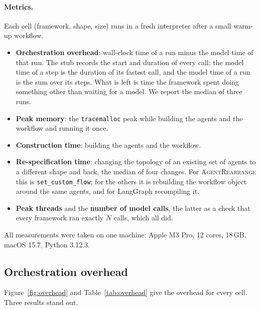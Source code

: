 \documentclass[11pt]{article}
\newcommand{\code}[1]{\texttt{#1}}
\newcommand{\AR}{\textsc{AgentRearrange}}
\begin{document}
\paragraph{Metrics.}
Each cell (framework, shape, size) runs in a fresh interpreter after a small warm-up workflow.
\begin{itemize}
  \item \textbf{Orchestration overhead}: wall-clock time of a run minus the model time of that run. The stub records the start and duration of every call; the model time of a step is the duration of its fastest call, and the model time of a run is the sum over its steps. What is left is time the framework spent doing something other than waiting for a model. We report the median of three runs.
  \item \textbf{Peak memory}: the \code{tracemalloc} peak while building the agents and the workflow and running it once.
  \item \textbf{Construction time}: building the agents and the workflow.
  \item \textbf{Re-specification time}: changing the topology of an existing set of agents to a different shape and back, the median of four changes. For \AR{} this is \code{set\_custom\_flow}; for the others it is rebuilding the workflow object around the same agents, and for LangGraph recompiling it.
  \item \textbf{Peak threads} and the \textbf{number of model calls}, the latter as a check that every framework ran exactly $N$ calls, which all did.
\end{itemize}

\noindent All measurements were taken on one machine: Apple M3 Pro, 12 cores, 18\,GB, macOS 15.7, Python 3.12.3.

\subsection{Orchestration overhead}

Figure~\ref{fig:overhead} and Table~\ref{tab:overhead} give the overhead for every cell. Three results stand out.
\end{document}
